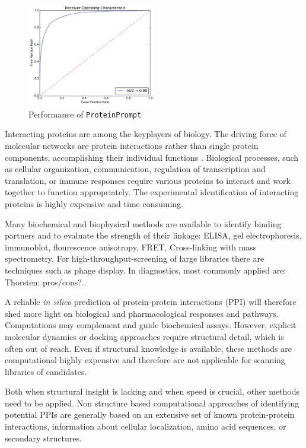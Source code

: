 \documentclass[preprint,3p,times,twocolumn]{elsarticle}
\newcommand{\TODO}[1] {\begingroup\color{red}#1\endgroup}
\newcommand{\tool}{\texttt{ProteinPrompt}\hspace{2pt}}
\begin{document}
\noindent\begin{figure}
\includegraphics[width=0.5\textwidth]{img/meta_final_roc.pdf}
\caption{Performance of \tool}
\end{figure} 


Interacting proteins are among the keyplayers of biology.
The driving force of molecular networks are protein interactions rather than single protein components, accomplishing their individual functions \cite{Pawson:2004}.
Biological processes, such as cellular organization, communication, regulation of
transcription and translation, or immune responses require various proteins to interact and
work together to function appropriately.
The experimental identification of interacting proteins is highly expensive and time consuming.

Many biochemical and biophysical methods are available to identify binding partners and to evaluate the strength of their linkage:
ELISA, gel electrophoresis, immunoblot, flourescence anisotropy, FRET,
Cross-linking with mass spectrometry.
For high-throughput-screening of large libraries there are techniques such as phage display.
In diagnostics, most commonly applied are: \TODO{Thorsten: pros/cons?..}

A reliable \textit{in silico} prediction of protein-protein
interactions (PPI) will therefore shed more light on biological and pharmacological responses and pathways.
Computations may complement and guide biochemical assays.
However, explicit molecular dynamics or docking approaches require structural detail, which is often out of reach.
Even if structural knowledge is available, these methods are computational highly expensive and therefore are not applicable for scanning libraries of candidates.

Both when structural insight is lacking and when speed is crucial, other methods need to be applied.
Non structure based computational approaches of identifying potential PPIs are generally based
on an extensive set of known protein-protein interactions, information
about cellular localization, amino acid sequences, or secondary
structures.
\end{document}

